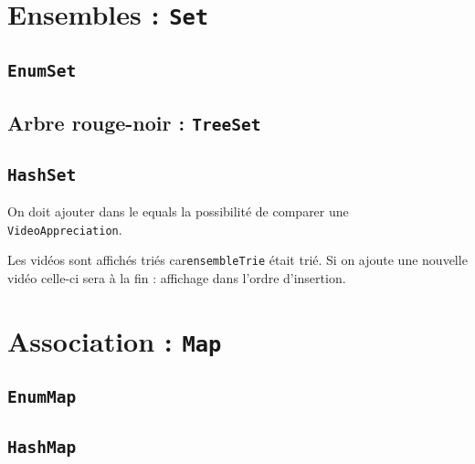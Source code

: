 \documentclass[12pt,a4paper,openany]{book}
\begin{document}
	\chapter{Ensembles : \texttt{Set}}
	\section{\texttt{EnumSet}}
		
	\section{Arbre rouge-noir : \texttt{TreeSet}}
		
		
	\section{\texttt{HashSet}}
		
		
		

	On doit ajouter dans le equals la possibilité de comparer une \texttt{VideoAppreciation}.
		
		
	Les vidéos sont affichés triés car\texttt{ensembleTrie} était trié. Si on ajoute une nouvelle vidéo celle-ci sera à la fin : affichage dans
	l'ordre d'insertion.

	\chapter{Association : \texttt{Map}}
	\section{\texttt{EnumMap}}
		
	
	\section{\texttt{HashMap}}
		
		
		
		
	\appendix
	\lstlistoflistings
\end{document}
